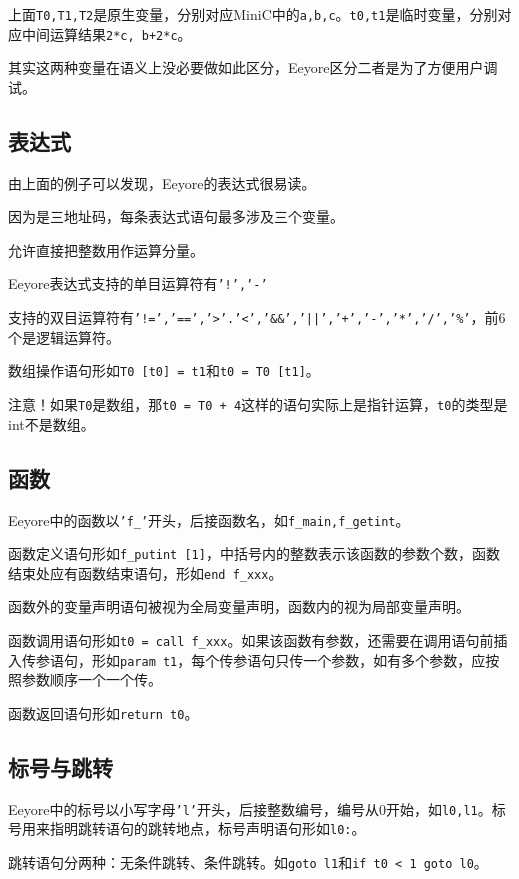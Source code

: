 \documentclass{ctexart}
\begin{document}
上面\texttt{T0,T1,T2}是原生变量，分别对应MiniC中的\texttt{a,b,c}。\texttt{t0,t1}是临时变量，分别对应中间运算结果\texttt{2*c, b+2*c}。

其实这两种变量在语义上没必要做如此区分，Eeyore区分二者是为了方便用户调试。

\subsection{表达式}
由上面的例子可以发现，Eeyore的表达式很易读。

因为是三地址码，每条表达式语句最多涉及三个变量。

允许直接把整数用作运算分量。

Eeyore表达式支持的单目运算符有\texttt{'!','-'}

支持的双目运算符有\texttt{'!=','==','\textgreater'.'\textless','\&\&','||','+','-','*','/','\%'}，前6个是逻辑运算符。

数组操作语句形如\texttt{T0 [t0] = t1}和\texttt{t0 = T0 [t1]}。

注意！如果\texttt{T0}是数组，那\texttt{t0 = T0 + 4}这样的语句实际上是指针运算，\texttt{t0}的类型是int不是数组。

\subsection{函数}
Eeyore中的函数以\texttt{'f\_'}开头，后接函数名，如\texttt{f\_main,f\_getint}。

函数定义语句形如\texttt{f\_putint [1]}，中括号内的整数表示该函数的参数个数，函数结束处应有函数结束语句，形如\texttt{end f\_xxx}。

函数外的变量声明语句被视为全局变量声明，函数内的视为局部变量声明。

函数调用语句形如\texttt{t0 = call f\_xxx}。如果该函数有参数，还需要在调用语句前插入传参语句，形如\texttt{param t1}，每个传参语句只传一个参数，如有多个参数，应按照参数顺序一个一个传。

函数返回语句形如\texttt{return t0}。

\subsection{标号与跳转}
Eeyore中的标号以小写字母\texttt{'l'}开头，后接整数编号，编号从0开始，如\texttt{l0,l1}。标号用来指明跳转语句的跳转地点，标号声明语句形如\texttt{l0:}。

跳转语句分两种：无条件跳转、条件跳转。如\texttt{goto l1}和\texttt{if t0 < 1 goto l0}。
\end{document}
